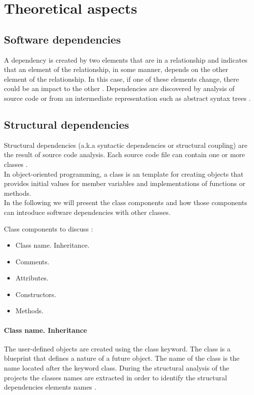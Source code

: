 \chapter{Theoretical aspects}

\section{Software dependencies}
\tab A dependency is created by two elements that are in a relationship and indicates that an element of the relationship, in some manner, depends on the other element of the relationship. In this case, if one of these elements change, there could be an impact to the other \cite{ct2}. Dependencies are discovered by analysis of source code or from an intermediate representation such as abstract syntax trees \cite{ct3} .

\section{Structural dependencies}
\tab Structural dependencies (a.k.a syntactic dependencies or structural coupling) are the result of source code analysis. Each source code ﬁle can contain one or more classes \cite{ct4}.\\

In object-oriented programming, a class is an template for creating objects that provides initial values for member variables and implementations of functions or methods. \cite{oopconcept}\\
\tab In the following we will present the class components and how those components can introduce software dependencies with other classes.

Class components to discuss :
\begin{itemize}
  \item Class name. Inheritance.
  \item Comments.
  \item Attributes. 
   \item Constructors.
   \item Methods.
\end{itemize}


\subsubsection{Class name. Inheritance}
The user-defined objects are created using the class keyword. The class is a blueprint that defines a nature of a future object. 
The name of the class is the name located after the keyword class. During the structural analysis of the projects the classes names are extracted in order to identify the structural dependencies elements names .

